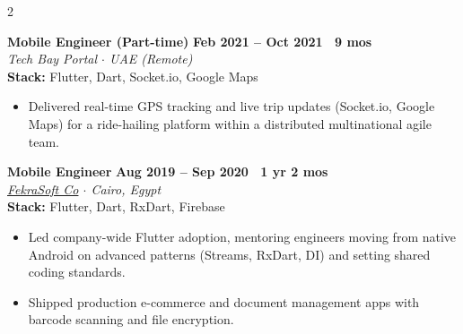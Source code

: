 \documentclass[10pt,a4paper]{article}
\newcommand{\workexp}[5]{
    \noindent \textbf{#1} \hfill \textbf{#2} \\
    \textit{#3} \\
    {\small\color{techstack}\textbf{Stack:} #4}
    \vspace{0pt}
    \begin{itemize}[noitemsep,topsep=0pt,leftmargin=1.5em]
    #5
    \end{itemize}
    \vspace{1pt}
}
\begin{document}
\begin{paracol}{2}
        \workexp{Mobile Engineer (Part-time)}{Feb 2021 -- Oct 2021 \textbullet\ 9 mos}
        {Tech Bay Portal $\cdot$ UAE (Remote)}
        {Flutter, Dart, Socket.io, Google Maps}
        {
            \item Delivered real-time GPS tracking and live trip updates (Socket.io, Google Maps) for a ride-hailing platform within a distributed multinational agile team.
        }

        \workexp{Mobile Engineer}{Aug 2019 -- Sep 2020 \textbullet\ 1 yr 2 mos}
        {\href{https://www.linkedin.com/company/fekrasoft}{FekraSoft Co} $\cdot$ Cairo, Egypt}
        {Flutter, Dart, RxDart, Firebase}
        {
            \item Led company-wide Flutter adoption, mentoring engineers moving from native Android on advanced patterns (Streams, RxDart, DI) and setting shared coding standards.
        \item Shipped production e-commerce and document management apps with barcode scanning and file encryption.
        }

    \end{paracol}
\end{document}
